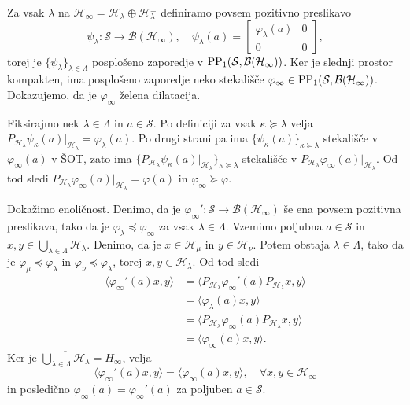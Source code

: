 \begin{dokaz}
    Za vsak $\lambda$ na $\mathcal{H}_\infty = \mathcal{H}_\lambda \oplus \mathcal{H}_\lambda ^\perp$ definiramo povsem pozitivno preslikavo 
    $$\psi_\lambda: \mathcal{S} \to \mathcal{B}(\mathcal{H}_\infty),\quad \psi_\lambda (a) = \begin{bmatrix}
        \varphi_\lambda (a) & 0\\
        0 & 0
    \end{bmatrix},$$
    torej je $\{\psi_\lambda\}_{\lambda \in \Lambda}$ posplošeno zaporedje v $\operatorname{PP}_1 (\mathcal{S}, \mathcal{B}(\mathcal{H}_\infty))$.
    Ker je slednji prostor kompakten, ima posplošeno zaporedje neko stekališče $\varphi_\infty \in \operatorname{PP}_1 (\mathcal{S}, \mathcal{B}(\mathcal{H}_\infty))$.
    Dokazujemo, da je $\varphi_\infty$ želena dilatacija. 

    Fiksirajmo nek $\lambda \in \Lambda$ in $a \in \mathcal{S}$.
    Po definiciji za vsak $\kappa \succeq \lambda$ velja $P_{\mathcal{H}_\lambda} \psi_\kappa (a) \big|_{\mathcal{H}_\lambda} = \varphi_\lambda (a)$.
    Po drugi strani pa ima $\{\psi_\kappa (a)\}_{\kappa \succeq \lambda}$ stekališče v $\varphi_\infty (a)$ v ŠOT,
    zato ima $\{P_{\mathcal{H}_\lambda} \psi_\kappa (a) |_{\mathcal{H}_\lambda}\}_{\kappa \succeq \lambda}$ stekališče v $P_{\mathcal{H}_\lambda} \varphi_\infty (a) |_{\mathcal{H}_\lambda}$.
    Od tod sledi $P_{\mathcal{H}_\lambda} \varphi_\infty(a) |_{\mathcal{H}_\lambda} = \varphi(a)$ in $\varphi_\infty \succeq \varphi$.

    Dokažimo enoličnost. Denimo, da je $\varphi_\infty ': \mathcal{S} \to \mathcal{B} (\mathcal{H}_\infty)$ še ena povsem pozitivna preslikava,
    tako da je $\varphi_\lambda \preceq \varphi_\infty$ za vsak $\lambda \in \Lambda$. Vzemimo poljubna $a \in \mathcal{S}$ in $x, y \in \bigcup_{\lambda \in \Lambda} \mathcal{H}_\lambda$.
    Denimo, da je $x \in \mathcal{H}_\mu$ in $y \in \mathcal{H}_\nu$. Potem obstaja $\lambda \in \Lambda$, tako da je $\varphi_\mu \preceq \varphi_\lambda$ in $\varphi_\nu \preceq \varphi_\lambda$,    
    torej $x, y \in \mathcal{H}_\lambda$. Od tod sledi
    \begin{align*}
        \langle \varphi_\infty ' (a)x, y \rangle &= \langle P_{\mathcal{H}_\lambda}\varphi_\infty ' (a) P_{\mathcal{H}_\lambda}x, y \rangle\\
        &= \langle \varphi_\lambda (a) x, y \rangle\\
        &= \langle P_{\mathcal{H}_\lambda}\varphi_\infty (a) P_{\mathcal{H}_\lambda}x, y \rangle\\
        &= \langle \varphi_\infty (a) x, y \rangle.
    \end{align*} 
    Ker je $\overline{\bigcup_{\lambda \in \Lambda} \mathcal{H}_\lambda} = H_\infty$, velja 
    $$\langle \varphi_\infty ' (a) x, y \rangle = \langle \varphi_\infty (a) x, y \rangle,\quad \forall x, y \in \mathcal{H}_\infty$$
    in posledično $\varphi_\infty (a) = \varphi_\infty ' (a)$ za poljuben $a \in \mathcal{S}$. 


\end{dokaz}
